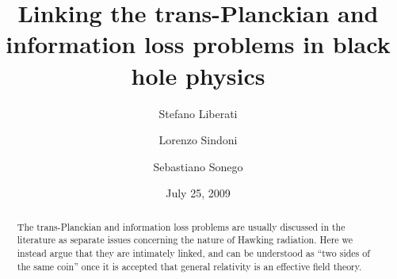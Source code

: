 \documentclass[prd,groupedaddress, showpacs, showkeys, onecolumn, nofootinbib, 12pt]{revtex4-2}
\begin{document}
\title{Linking the trans-Planckian and information loss problems in black hole physics}
\author{Stefano Liberati}
\author{Lorenzo Sindoni}
\author{Sebastiano Sonego}
\date{July 25, 2009}
\bigskip\sloppy

\begin{abstract}

The trans-Planckian and information loss problems are usually discussed in the literature as separate issues concerning the nature of Hawking radiation. Here we instead argue that they are intimately linked, and can be understood as ``two sides of the same coin'' once it is accepted that general relativity is an effective field theory. 

\end{abstract}


\maketitle
\end{document}
